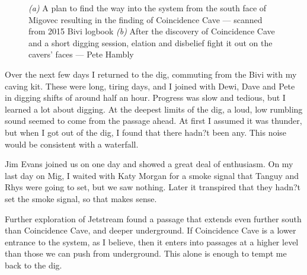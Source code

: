 \begin{figure}[t!]
        \caption{
            \emph{(a)} A plan to find the way into the system from the south face of Migovec resulting in the finding of Coincidence Cave --- scanned from 2015 Bivi logbook
            \emph{(b)} After the discovery of Coincidence Cave and a short digging session, elation and disbelief fight it out on the cavers' faces --- Pete Hambly}
        \label{}

    \end{figure}

    Over the next few days I returned to the dig, commuting from the Bivi with my caving kit. These were long, tiring days, and I joined with Dewi, Dave and Pete in digging shifts of around half an hour. Progress was slow and tedious, but I learned a lot about digging. At the deepest limits of the dig, a loud, low rumbling sound seemed to come from the passage ahead. At first I assumed it was thunder, but when I got out of the dig, I found that there hadn?t been any. This noise would be consistent with a waterfall.

    Jim Evans joined us on one day and showed a great deal of enthusiasm. On my last day on Mig, I waited with Katy Morgan for a smoke signal that Tanguy and Rhys were going to set, but we saw nothing. Later it transpired that they hadn?t set the smoke signal, so that makes sense.

    Further exploration of Jetstream found a passage that extends even further south than Coincidence Cave, and deeper underground. If Coincidence Cave is a lower entrance to the system, as I believe, then it enters into passages at a higher level than those we can push from underground. This alone is enough to tempt me back to the dig.

